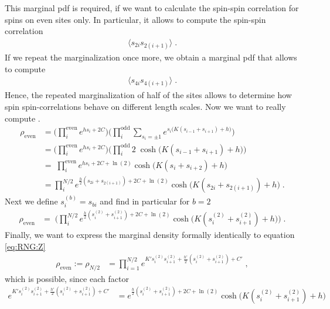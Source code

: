 %
This marginal pdf is required, if we want to calculate the spin-spin correlation for spins on
even sites only. In particular, it allows to compute the spin-spin correlation 
%
\begin{align}\label{eq:}
\langle s_{2i} s_{2(i+1)}\rangle\;.
\end{align}
%
If we repeat the marginalization once more, we obtain a marginal pdf that allows to compute
%
\begin{align}\label{eq:}
\langle s_{4i} s_{4(i+1)}\rangle\;.
\end{align}
%
Hence, the repeated marginalization of half of the sites allows to determine how spin spin-correlations behave on different length scales.
Now we want to really compute .
%
\begin{align}\label{eq:}
\rho_\text{even} &= \bigg( \prod_{i}^\text{even} e^{h s_{i} + 2 C}   \bigg)
\bigg( \prod_{i}^\text{odd}
\sum_{s_{i}=\pm 1}
e^{s_{i}\big(K (s_{i-1}+ s_{i+1}) + h\big)}\bigg)\\
&=\bigg( \prod_{i}^\text{even} e^{h s_{i} + 2 C}   \bigg)
\bigg( \prod_{i}^\text{odd}
2\;\cosh\big( K (s_{i-1}+ s_{i+1}) + h \big)
\bigg)\\
&= \; \prod_{i}^\text{even} e^{h s_{i} + 2 C + \ln(2)  }
\cosh\big( K (s_{i}+ s_{i+2}) + h \big)\\
&=  \prod_{i}^{N/2} e^{\frac{h}{2} (s_{2i}+s_{2(i+1)}) + 2 C + \ln(2)  }
\cosh\big( K (s_{2i}+ s_{2(i+1)}) + h \big)\;.
\end{align}
%
Next we define $s^{(b)}_{i}=s_{b i}$ and find in particular for $b=2$
%
\begin{align}\label{eq:}
\rho_\text{even}
&= \;\bigg( \prod_{i}^{N/2} e^{\frac{h}{2} (s^{(2)}_{i}+s^{(2)}_{i+1}) + 2 C + \ln(2)  }
\cosh\big( K (s^{(2)}_{i}+ s^{(2)}_{i+1}) + h \big)
\bigg)\;.
\end{align}
%
Finally, we want to express the marginal density formally identically to equation \eqref{eq:RNG:Z}
%
\begin{align}\label{eq:RNG:Z3}
\rho_\text{even}:=\rho_{N/2} &= 
\prod_{i=1}^{N/2}
e^{K' s^{(2)}_{i}s^{(2)}_{i+1} + \frac{h'}{2} (s^{(2)}_{i}+s^{(2)}_{i+1}) + C'}\;,
\end{align}
which is possible, since each factor
%
\begin{align*}
e^{K' s^{(2)}_{i}s^{(2)}_{i+1} + \frac{h'}{2} (s^{(2)}_{i}+s^{(2)}_{i+1}) + C'}
&=
e^{\frac{h}{2} (s^{(2)}_{i}+s^{(2)}_{i+1})+2 C + \ln(2)  }
\cosh\big( K (s^{(2)}_{i}+ s^{(2)}_{i+1}) + h \big)
\end{align*}
